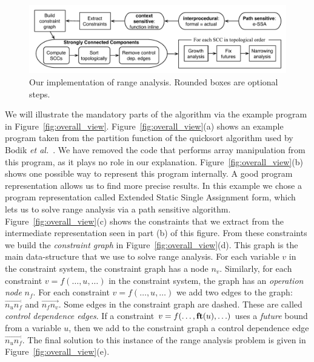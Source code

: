 \documentclass{paper}
\newcommand{\fun}[1]{\mbox{\textbf{#1}}}
\begin{document}
\begin{figure}[H]
\begin{center}
\includegraphics[width=\textwidth]{images/algorithm}
\end{center}
\caption{\label{fig:algorithm}
Our implementation of range analysis. Rounded boxes are optional steps.}
\end{figure}

We will illustrate the mandatory parts of the
algorithm via the example program in Figure~\ref{fig:overall_view}.
Figure~\ref{fig:overall_view}(a) shows an example program taken from the
partition function of the quicksort algorithm used by Bodik
{\em et al.}~\cite{Bodik00}.
We have removed the code that performs array manipulation from this program,
as it plays no role in our explanation.
Figure~\ref{fig:overall_view}(b) shows one possible way to represent this
program internally.
A good program representation allows us to find more precise results.
In this example we chose a program representation called
Extended Static Single Assignment form, which lets us to solve range
analysis via a path sensitive algorithm.
Figure~\ref{fig:overall_view}(c) shows the constraints that we extract from
the intermediate representation seen in part (b) of this figure.
From these constraints we build the {\em constraint graph} in
Figure~\ref{fig:overall_view}(d).
This graph is the main data-structure that we use to solve range analysis.
For each variable $v$ in the constraint system, the constraint graph has a node
$n_v$.
Similarly, for each constraint $v = f(\ldots, u, \ldots)$ in the constraint
system, the graph has an {\em operation node} $n_f$.
For each constraint $v = f(\ldots, u, \ldots)$ we add two edges to the
graph: $\overrightarrow{n_un_f}$ and $\overrightarrow{n_fn_v}$.
Some edges in the constraint graph are dashed.
These are called {\em control dependence edges}.
If a constraint $v = f(\ldots, \fun{ft}(u), \ldots)$ uses a {\em future}
bound from a variable $u$, then we add to the constraint graph a control
dependence edge $\overrightarrow{n_un_f}$.
The final solution to this instance of the range analysis problem is
given in Figure~\ref{fig:overall_view}(e).
\end{document}
